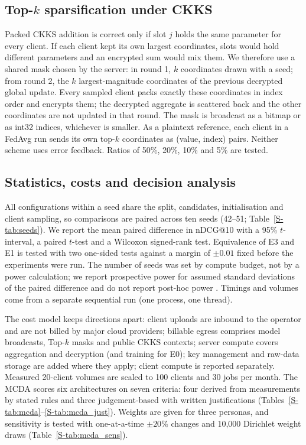 \documentclass[11pt,a4paper]{article}
\begin{document}
\subsection{Top-\texorpdfstring{$k$}{k} sparsification under CKKS}

Packed CKKS addition is correct only if slot $j$ holds the same parameter for every client. If each client kept its own largest coordinates, slots would hold different parameters and an encrypted sum would mix them. We therefore use a shared mask chosen by the server: in round 1, $k$ coordinates drawn with a seed; from round 2, the $k$ largest-magnitude coordinates of the previous decrypted global update. Every sampled client packs exactly these coordinates in index order and encrypts them; the decrypted aggregate is scattered back and the other coordinates are not updated in that round. The mask is broadcast as a bitmap or as int32 indices, whichever is smaller. As a plaintext reference, each client in a FedAvg run sends its own top-$k$ coordinates as (value, index) pairs. Neither scheme uses error feedback. Ratios of 50\%, 20\%, 10\% and 5\% are tested.

\subsection{Statistics, costs and decision analysis}

All configurations within a seed share the split, candidates, initialisation and client sampling, so comparisons are paired across ten seeds (42--51; Table~\ref{S-tab:seeds}). We report the mean paired difference in nDCG@10 with a 95\% $t$-interval, a paired $t$-test and a Wilcoxon signed-rank test. Equivalence of E3 and E1 is tested with two one-sided tests \cite{schuirmann1987comparison} against a margin of $\pm0.01$ fixed before the experiments were run. The number of seeds was set by compute budget, not by a power calculation; we report prospective power for assumed standard deviations of the paired difference and do not report post-hoc power \cite{hoenig2001abuse}. Timings and volumes come from a separate sequential run (one process, one thread).

The cost model keeps directions apart: client uploads are inbound to the operator and are not billed by major cloud providers; billable egress comprises model broadcasts, Top-$k$ masks and public CKKS contexts; server compute covers aggregation and decryption (and training for E0); key management and raw-data storage are added where they apply; client compute is reported separately. Measured 20-client volumes are scaled to 100 clients and 30 jobs per month. The MCDA scores six architectures on seven criteria: four derived from measurements by stated rules and three judgement-based with written justifications (Tables~\ref{S-tab:mcda}--\ref{S-tab:mcda_just}). Weights are given for three personas, and sensitivity is tested with one-at-a-time $\pm20\%$ changes and 10,000 Dirichlet weight draws (Table~\ref{S-tab:mcda_sens}).
\end{document}
